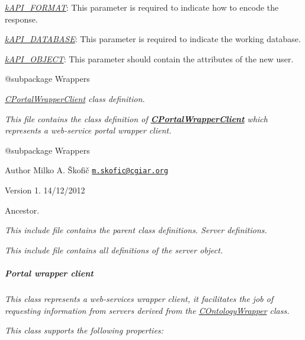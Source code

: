 {\begin{DoxyItemize}
\begin{DoxyItemize}
\begin{DoxyItemize}
\item {\itshape \hyperlink{}{k\-A\-P\-I\-\_\-\-F\-O\-R\-M\-A\-T}}\-: This parameter is required to indicate how to encode the response. 
\item {\itshape \hyperlink{}{k\-A\-P\-I\-\_\-\-D\-A\-T\-A\-B\-A\-S\-E}}\-: This parameter is required to indicate the working database. 
\item {\itshape \hyperlink{}{k\-A\-P\-I\-\_\-\-O\-B\-J\-E\-C\-T}}\-: This parameter should contain the attributes of the new user. 
\end{DoxyItemize}
\end{DoxyItemize}
\end{DoxyItemize}}

{\itshape \begin{DoxyVerb} @subpackage        Wrappers\end{DoxyVerb}
}

{\itshape {\itshape \hyperlink{class_c_portal_wrapper_client}{C\-Portal\-Wrapper\-Client}} class definition.}

{\itshape This file contains the class definition of {\bfseries \hyperlink{class_c_portal_wrapper_client}{C\-Portal\-Wrapper\-Client}} which represents a web-\/service portal wrapper client.}

{\itshape \begin{DoxyVerb} @subpackage        Wrappers
\end{DoxyVerb}
}

{\itshape \begin{DoxyAuthor}{Author}
Milko A. Škofič \href{mailto:m.skofic@cgiar.org}{\tt m.\-skofic@cgiar.\-org} 
\end{DoxyAuthor}
\begin{DoxyVersion}{Version}
1. 14/12/2012
\end{DoxyVersion}
Ancestor.}

{\itshape This include file contains the parent class definitions. Server definitions.}

{\itshape This include file contains all definitions of the server object. \subparagraph*{Portal wrapper client}}

{\itshape }

{\itshape This class represents a web-\/services wrapper client, it facilitates the job of requesting information from servers derived from the \hyperlink{class_c_ontology_wrapper}{C\-Ontology\-Wrapper} class.}

{\itshape This class supports the following properties\-:}

